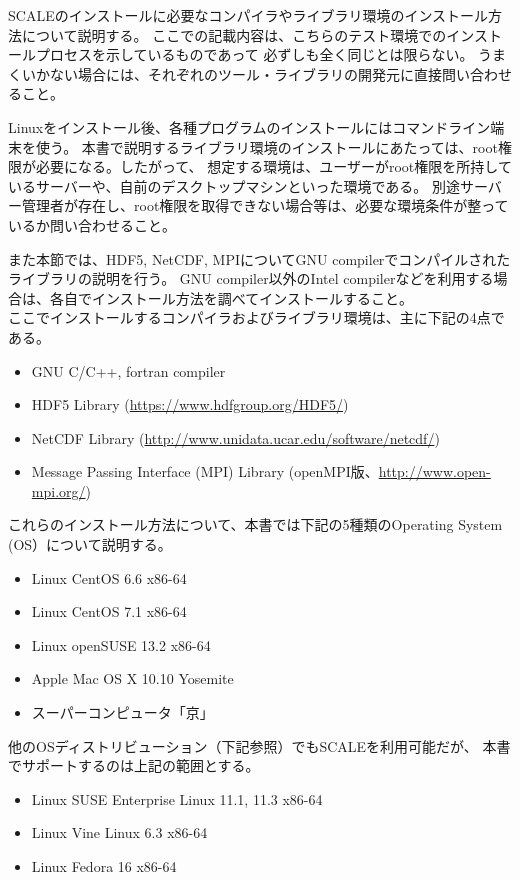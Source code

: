 
SCALEのインストールに必要なコンパイラやライブラリ環境のインストール方法について説明する。
ここでの記載内容は、こちらのテスト環境でのインストールプロセスを示しているものであって
必ずしも全く同じとは限らない。
うまくいかない場合には、それぞれのツール・ライブラリの開発元に直接問い合わせること。


Linuxをインストール後、各種プログラムのインストールにはコマンドライン端末を使う。
本書で説明するライブラリ環境のインストールにあたっては、root権限が必要になる。したがって、
想定する環境は、ユーザーがroot権限を所持しているサーバーや、自前のデスクトップマシンといった環境である。
別途サーバー管理者が存在し、root権限を取得できない場合等は、必要な環境条件が整っているか問い合わせること。

また本節では、HDF5, NetCDF, MPIについてGNU compilerでコンパイルされたライブラリの説明を行う。
GNU compiler以外のIntel compilerなどを利用する場合は、各自でインストール方法を調べてインストールすること。\\

\noindent ここでインストールするコンパイラおよびライブラリ環境は、主に下記の4点である。
\begin{itemize}
\item GNU C/C++, fortran compiler
\item HDF5 Library (\url{https://www.hdfgroup.org/HDF5/})
\item NetCDF Library (\url{http://www.unidata.ucar.edu/software/netcdf/})
\item Message Passing Interface (MPI) Library (openMPI版、\url{http://www.open-mpi.org/})
\end{itemize}
これらのインストール方法について、本書では下記の5種類のOperating System (OS）について説明する。
\begin{itemize}
\item Linux CentOS 6.6 x86-64
\item Linux CentOS 7.1 x86-64
\item Linux openSUSE 13.2 x86-64
\item Apple Mac OS X 10.10 Yosemite
\item スーパーコンピュータ「京」
\end{itemize}
他のOSディストリビューション（下記参照）でもSCALEを利用可能だが、
本書でサポートするのは上記の範囲とする。\\

\begin{itemize}
\item Linux SUSE Enterprise Linux 11.1, 11.3 x86-64
\item Linux Vine Linux 6.3 x86-64
\item Linux Fedora 16 x86-64
\end{itemize}


